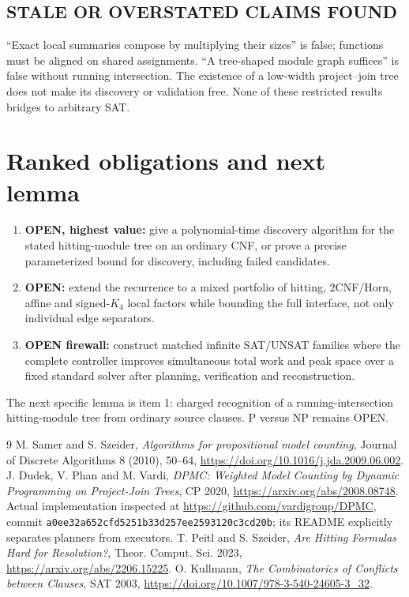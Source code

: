 \documentclass[11pt]{article}
\begin{document}
\subsection*{STALE OR OVERSTATED CLAIMS FOUND}
``Exact local summaries compose by multiplying their sizes'' is false; functions
must be aligned on shared assignments.  ``A tree-shaped module graph suffices'' is
false without running intersection.  The existence of a low-width project--join
tree does not make its discovery or validation free.  None of these restricted
results bridges to arbitrary SAT.

\section{Ranked obligations and next lemma}
\begin{enumerate}
\item \textbf{OPEN, highest value:} give a polynomial-time discovery algorithm for
the stated hitting-module tree on an ordinary CNF, or prove a precise parameterized
bound for discovery, including failed candidates.
\item \textbf{OPEN:} extend the recurrence to a mixed portfolio of hitting,
2CNF/Horn, affine and signed-$K_4$ local factors while bounding the full interface,
not only individual edge separators.
\item \textbf{OPEN firewall:} construct matched infinite SAT/UNSAT families where
the complete controller improves simultaneous total work and peak space over a
fixed standard solver after planning, verification and reconstruction.
\end{enumerate}
The next specific lemma is item 1: charged recognition of a running-intersection
hitting-module tree from ordinary source clauses.  P versus NP remains OPEN.

\begin{thebibliography}{9}
 M. Samer and S. Szeider,
\emph{Algorithms for propositional model counting}, Journal of Discrete
Algorithms 8 (2010), 50--64, \url{https://doi.org/10.1016/j.jda.2009.06.002}.
 J. Dudek, V. Phan and M. Vardi,
\emph{DPMC: Weighted Model Counting by Dynamic Programming on Project-Join Trees},
CP 2020, \url{https://arxiv.org/abs/2008.08748}.
Actual implementation inspected at \url{https://github.com/vardigroup/DPMC},
commit \texttt{a0ee32a652cfd5251b33d257ee2593120c3cd20b}; its README explicitly
separates planners from executors.
 T. Peitl and S. Szeider,
\emph{Are Hitting Formulas Hard for Resolution?}, Theor. Comput. Sci. 2023,
\url{https://arxiv.org/abs/2206.15225}.
 O. Kullmann, \emph{The Combinatorics of Conflicts between
Clauses}, SAT 2003, \url{https://doi.org/10.1007/978-3-540-24605-3_32}.
\end{thebibliography}
\end{document}
